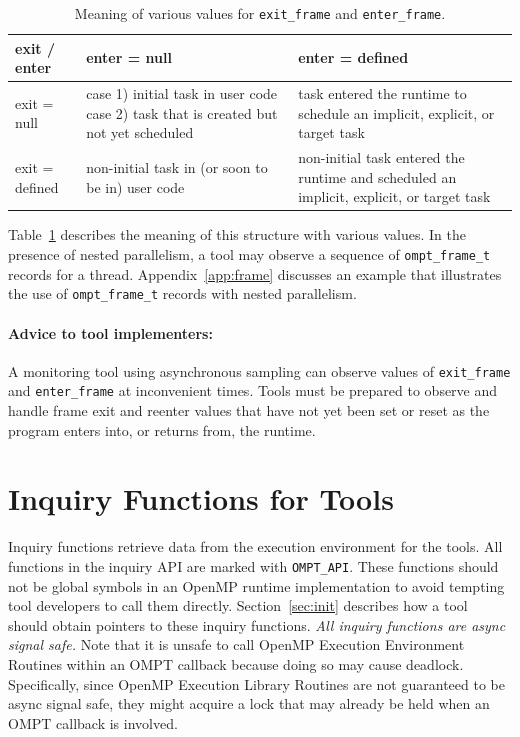 \documentclass{article}
\begin{document}
\begin{table}
\begin{center}
\begin{tabular}{|l|p{2in}|p{2in}|}
\hline
exit / enter 	& enter = null										& enter = defined \\\hline\hline
exit = null		& case 1)  initial task in user code case 2) task that is created but not yet scheduled &  task entered the runtime to schedule an implicit, explicit, or target task \\\hline
exit = defined 	& non-initial task in (or soon to be in) user code							& non-initial task entered the runtime and scheduled an implicit, explicit, or target task\\\hline
\end{tabular}
\end{center}
\caption{Meaning of various values for {\tt exit\_frame} and {\tt enter\_frame}.}
\label{tab:frame}
\end{table}

\noindent
Table~\ref{tab:frame} describes the meaning of this structure with various values.
In the presence of nested parallelism, a tool may observe a sequence of \verb|ompt_frame_t| records for a thread. Appendix~\ref{app:frame} discusses  an example that illustrates the use of \verb|ompt_frame_t| records with nested parallelism.

\paragraph{Advice to tool implementers:} A monitoring tool using
      asynchronous sampling can observe values of 
      \verb|exit_frame| and \verb|enter_frame| at inconvenient times. 
      Tools must be prepared to observe and handle frame exit and reenter values that have not yet been set or reset as the program enters into, or returns from, the runtime. 

\section{Inquiry Functions for Tools}
\label{sec:inquiry}

 Inquiry functions retrieve data from the execution environment for
 the tools. 
 All functions in the inquiry API are marked with \verb|OMPT_API|. These functions should not be global symbols in an OpenMP runtime implementation to avoid tempting tool developers to call them directly. Section~\ref{sec:init} describes how a tool should obtain pointers to these inquiry functions.
 {\em All inquiry functions are async signal safe.} 
 Note that it is unsafe to call OpenMP Execution Environment Routines within an OMPT callback because doing so may cause deadlock. 
 Specifically, since OpenMP Execution Library Routines are not guaranteed to be async signal safe, they might acquire a lock that may already be held when an OMPT callback is involved.
 
\end{document}
